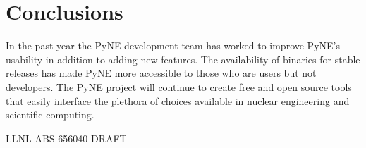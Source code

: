 \documentclass{anstrans}
\begin{document}
\section{Conclusions}

In the past year the PyNE development team has worked to improve PyNE's 
usability in addition to adding new features. The availability of binaries 
for stable releases has made PyNE more accessible to those who are users 
but not developers. The PyNE project will continue to create free and open 
source tools that easily interface the plethora of choices available in 
nuclear engineering and scientific computing. 

\vspace{0.1in}
\noindent LLNL-ABS-656040-DRAFT
 
 
\end{document}
